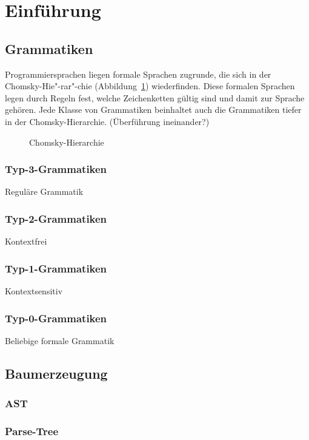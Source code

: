 \documentclass[../InterneDSLs.tex]{subfiles}
\begin{document}
\section{Einführung}

\subsection{Grammatiken}
Programmiersprachen liegen formale Sprachen zugrunde, die sich in der Chomsky-Hie"-rar"-chie (Abbildung~\ref{FIG:Chomksky-Hierarchie}) wiederfinden. Diese formalen Sprachen legen durch Regeln fest, welche Zeichenketten gültig sind und damit zur Sprache gehören. Jede Klasse von Grammatiken beinhaltet auch die Grammatiken tiefer in der Chomsky-Hierarchie. (Überführung ineinander?)

\begin{figure}
\centering
\def\svgwidth{0.5\textwidth}

\caption{Chomsky-Hierarchie}
\label{FIG:Chomksky-Hierarchie}
\end{figure}

\subsubsection{Typ-3-Grammatiken}
Reguläre Grammatik

\subsubsection{Typ-2-Grammatiken}
Kontextfrei

\subsubsection{Typ-1-Grammatiken}
Kontextsensitiv

\subsubsection{Typ-0-Grammatiken}
Beliebige formale Grammatik


\subsection{Baumerzeugung}


\subsubsection{AST}


\subsubsection{Parse-Tree}
\end{document}
